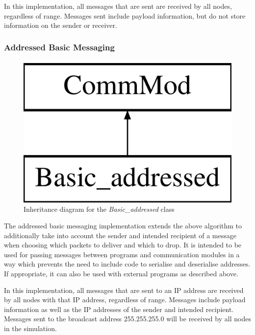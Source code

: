 In this implementation, all messages that are sent are received by all nodes, regardless of range. Messages sent include payload information, but do not store information on the sender or receiver.
	
\subsubsection{Addressed Basic Messaging}
\begin{figure}[H]
\centering
\includegraphics[scale=0.25]{../documentation/latex/class_basic__addressed}
\caption{Inheritance diagram for the \textit{Basic\_addressed} class}
\end{figure}

The addressed basic messaging implementation extends the above algorithm to additionally take into account the sender and intended recipient of a message when choosing which packets to deliver and which to drop. It is intended to be used for passing messages between programs and communication modules in a way which prevents the need to include code to serialise and deserialise addresses. If appropriate, it can also be used with external programs as described above.

In this implementation, all messages that are sent to an IP address are received by all nodes with that IP address, regardless of range. Messages include payload information as well as the IP addresses of the sender and intended recipient. Messages sent to the broadcast address 255.255.255.0 will be received by all nodes in the simulation.	
	
